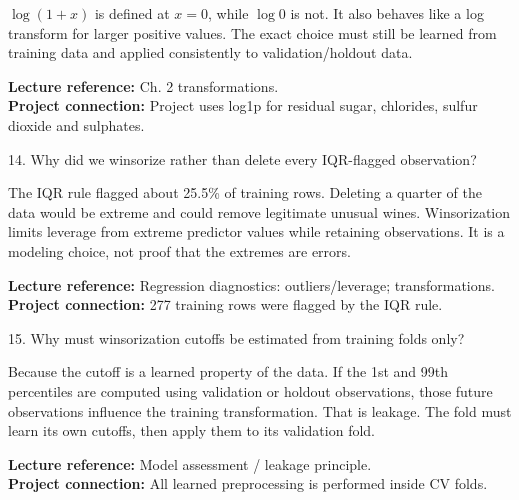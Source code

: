 \documentclass[10.5pt,a4paper]{article}
\newcommand{\chapref}[1]{\textbf{Lecture reference:} #1}
\newcommand{\projectref}[1]{\textbf{Project connection:} #1}
\begin{document}
\begin{answerbox}\(\log(1+x)\) is defined at \(x=0\), while \(\log 0\) is not. It also behaves like a log transform for larger positive values. The exact choice must still be learned from training data and applied consistently to validation/holdout data.\end{answerbox}
\begin{refbox}\chapref{Ch. 2 transformations.}\\\projectref{Project uses log1p for residual sugar, chlorides, sulfur dioxide and sulphates.}\end{refbox}
\begin{qbox}{14. Why did we winsorize rather than delete every IQR-flagged observation?}
\end{qbox}
\begin{answerbox}The IQR rule flagged about 25.5\% of training rows. Deleting a quarter of the data would be extreme and could remove legitimate unusual wines. Winsorization limits leverage from extreme predictor values while retaining observations. It is a modeling choice, not proof that the extremes are errors.\end{answerbox}
\begin{refbox}\chapref{Regression diagnostics: outliers/leverage; transformations.}\\\projectref{277 training rows were flagged by the IQR rule.}\end{refbox}
\begin{qbox}{15. Why must winsorization cutoffs be estimated from training folds only?}
\end{qbox}
\begin{answerbox}Because the cutoff is a learned property of the data. If the 1st and 99th percentiles are computed using validation or holdout observations, those future observations influence the training transformation. That is leakage. The fold must learn its own cutoffs, then apply them to its validation fold.\end{answerbox}
\begin{refbox}\chapref{Model assessment / leakage principle.}\\\projectref{All learned preprocessing is performed inside CV folds.}\end{refbox}
\end{document}
